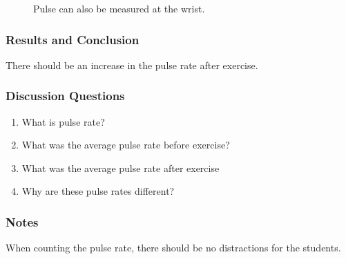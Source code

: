 \begin{figure}[h]
\begin{center}
\def\svgwidth{4cm}

\caption{Pulse can also be measured at the wrist.}
\label{fig:pulse-2}
\end{center}
\end{figure}

\subsubsection*{Results and Conclusion}
There should be an increase in the pulse rate after exercise.

\subsubsection*{Discussion Questions}
\begin{enumerate}
\item{What is pulse rate?}
\item{What was the average pulse rate before exercise?}
\item{What was the average pulse rate after exercise}
\item{Why are these pulse rates different?}
\end{enumerate}

\subsubsection*{Notes}
When counting the pulse rate, there should be no distractions for the students.
